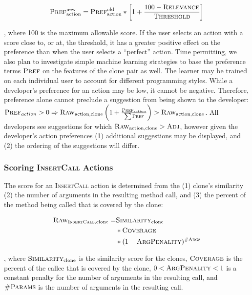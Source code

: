 \documentclass[nocopyrightspace,10pt]{sigplanconf}
\begin{document}
\begin{equation*}
  \textsc{Pref}^{\text{new}}_{\text{action}} = \textsc{Pref}^{\text{old}}_{\text{action}} * \left[ 1 + \frac{100 - \textsc{Relevance}}{\textsc{Threshold}} \right]
\end{equation*}

\noindent, where 100 is the maximum allowable
score. If the user selects an action with a score close to, or at, the
threshold, it has a greater positive effect on the preference than
when the user selects a ``perfect'' action.
Time permitting, we also plan to investigate simple machine learning
strategies to base the preference terms $\textsc{Pref}$ on the features of the
clone pair as well. The learner may
be trained on each individual user to
account for different programming styles.
While a developer's preference for an action may be low, it cannot be
negative. Therefore, preference alone cannot preclude a suggestion
from being shown to the developer: $\textsc{Pref}_{action} > 0 \Rightarrow
\textsc{Raw}_{\text{action,clone}}\left(1 + \frac{\textsc{Pref}_{\text{action}}}{\sum{\textsc{Pref}}}\right) > \textsc{Raw}_{\text{action,clone}}$.
All developers see suggestions for which $\textsc{Raw}_{\text{action,clone}} > \textsc{Adj}$,
however given the developer's action preferences (1) additional
suggestions may be displayed, and (2) the ordering of the suggestions
will differ.

\subsubsection{Scoring \textsc{InsertCall} Actions}
\label{sec:call}
The score for an \textsc{InsertCall} action is determined
from the (1) clone's similarity (2) the number of arguments in the
resulting method call, and (3) the percent of the method being called
that is covered by the clone:

\begin{align*}
  \textsc{Raw}_{\textsc{InsertCall}, \text{clone}} = & \textsc{Similarity}_{\text{clone}} \\ 
   & * \textsc{Coverage}  \\
   & * (1 - \textsc{ArgPenality})^{\textsc{\#Args}}
\end{align*}

\noindent, where $\textsc{Similarity}_{\text{clone}}$ is the similarity score for the clones, 
$\textsc{Coverage}$ is
the percent of the callee that is covered by the clone, $0 < \textsc{ArgPenality} < 1$ is a constant
penalty for the number of arguments in the resulting call, and $\textsc{\#Params}$ is
the number of arguments in the resulting call. 
\end{document}
